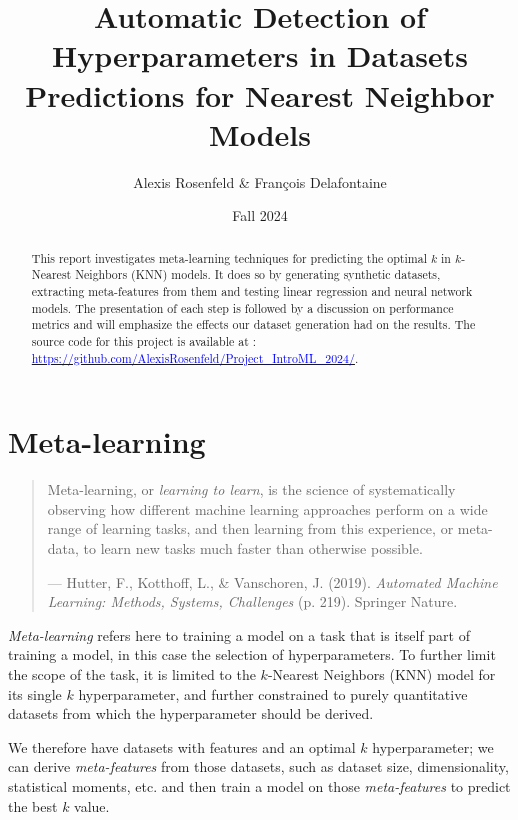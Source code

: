 \documentclass[a4paper,11pt]{article}
\title{Automatic Detection of Hyperparameters in Datasets \\
       \large Predictions for Nearest Neighbor Models}
\author{Alexis Rosenfeld \& François Delafontaine}
\date{Fall 2024}
\begin{document}
\maketitle

\begin{abstract}
    This report investigates meta-learning techniques for predicting the optimal \(k\) in \(k\)-Nearest Neighbors (KNN) models. It does so by generating synthetic datasets, extracting meta-features from them and testing linear regression and neural network models. The presentation of each step is followed by a discussion on performance metrics and will emphasize the effects our dataset generation had on the results.
    \newline
    \newline
    The source code for this project is available at :
\newline
\href{https://github.com/AlexisRosenfeld/Project_IntroML_2024/}{\small\textcolor{blue}{https://github.com/AlexisRosenfeld/Project\_IntroML\_2024/}}.
\end{abstract}

\tableofcontents

\section{Meta-learning}
\begin{quote}
    Meta-learning, or \emph{learning to learn}, is the science of systematically observing how different machine learning approaches perform on a wide range of learning tasks, and then learning from this experience, or meta-data, to learn new tasks much faster than otherwise possible.
\begin{flushright}
— Hutter, F., Kotthoff, L., \& Vanschoren, J. (2019). \emph{Automated Machine Learning: Methods, Systems, Challenges} (p. 219). Springer Nature.
\end{flushright}
\end{quote}

\textit{Meta-learning} refers here to training a model on a task that is itself part of training a model, in this case the selection of hyperparameters. To further limit the scope of the task, it is limited to the \(k\)-Nearest Neighbors (KNN) model for its single \(k\) hyperparameter, and further constrained to purely quantitative datasets from which the hyperparameter should be derived.

We therefore have datasets with features and an optimal \(k\) hyperparameter; we can derive \textit{meta-features} from those datasets, such as dataset size, dimensionality, statistical moments, etc. and then train a model on those \textit{meta-features} to predict the best \(k\) value.
\end{document}
